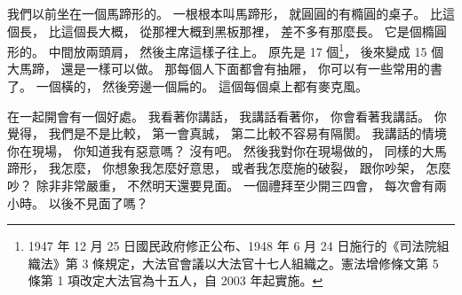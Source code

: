\hypertarget{w01:cue:929}{}我們以前坐在一個馬蹄形的。
\hypertarget{w01:cue:930}{}一根根本叫馬蹄形，
\hypertarget{w01:cue:931}{}就圓圓的有橢圓的桌子。
\hypertarget{w01:cue:932}{}比這個長，
\hypertarget{w01:cue:933}{}比這個長大概，
\hypertarget{w01:cue:934}{}從那裡大概到黑板那裡，
\hypertarget{w01:cue:935}{}差不多有那麼長。
\hypertarget{w01:cue:936}{}它是個橢圓形的。
\hypertarget{w01:cue:937}{}中間放兩頭肩，
\hypertarget{w01:cue:938}{}然後主席這樣子往上。
\hypertarget{w01:cue:939}{}原先是 17 個\footnote{1947 年 12 月 25 日國民政府修正公布、1948 年 6 月 24 日施行的《司法院組織法》第 3 條規定，大法官會議以大法官十七人組織之。憲法增修條文第 5 條第 1 項改定大法官為十五人，自 2003 年起實施。}，
\hypertarget{w01:cue:940}{}後來變成 15 個大馬蹄，
\hypertarget{w01:cue:941}{}還是一樣可以做。
\hypertarget{w01:cue:942}{}那每個人下面都會有抽屜，
\hypertarget{w01:cue:943}{}你可以有一些常用的書了。
\hypertarget{w01:cue:944}{}一個橫的，
\hypertarget{w01:cue:945}{}然後旁邊一個扁的。
\hypertarget{w01:cue:946}{}這個每個桌上都有麥克風。

\hypertarget{w01:cue:947}{}在一起開會有一個好處。
\hypertarget{w01:cue:948}{}我看著你講話，
\hypertarget{w01:cue:949}{}我講話看著你，
\hypertarget{w01:cue:950}{}你會看著我講話。
\hypertarget{w01:cue:951}{}你覺得，
\hypertarget{w01:cue:952}{}我們是不是比較，
\hypertarget{w01:cue:953}{}第一會真誠，
\hypertarget{w01:cue:954}{}第二比較不容易有隔閡。
\hypertarget{w01:cue:955}{}我講話的情境你在現場，
\hypertarget{w01:cue:956}{}你知道我有惡意嗎？
\hypertarget{w01:cue:957}{}沒有吧。
\hypertarget{w01:cue:958}{}然後我對你在現場做的，
\hypertarget{w01:cue:959}{}同樣的大馬蹄形，
\hypertarget{w01:cue:960}{}我怎麼，
\hypertarget{w01:cue:961}{}你想象我怎麼好意思，
\hypertarget{w01:cue:962}{}或者我怎麼施的破裂，
\hypertarget{w01:cue:963}{}跟你吵架，
\hypertarget{w01:cue:964}{}怎麼吵？
\hypertarget{w01:cue:965}{}除非非常嚴重，
\hypertarget{w01:cue:966}{}不然明天還要見面。
\hypertarget{w01:cue:967}{}一個禮拜至少開三四會，
\hypertarget{w01:cue:968}{}每次會有兩小時。
\hypertarget{w01:cue:969}{}以後不見面了嗎？

